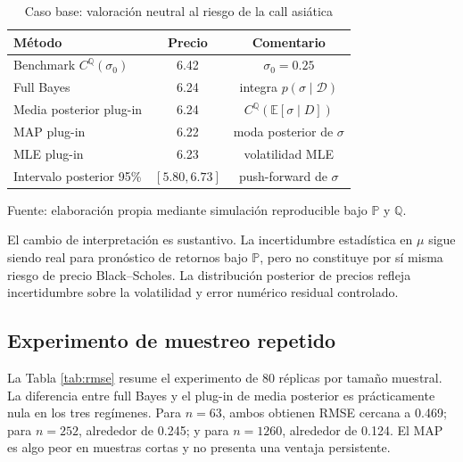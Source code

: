 \documentclass[12pt,letterpaper]{article}
\newcommand{\Pmeasure}{\mathbb{P}}
\newcommand{\Qmeasure}{\mathbb{Q}}
\newcommand{\E}{\mathbb{E}}
\begin{document}
\begin{table}[H]
\centering
\caption{Caso base: valoración neutral al riesgo de la call asiática}
\label{tab:baseline}
\begin{tabular}{lcc}
\toprule
Método & Precio & Comentario \\
\midrule
Benchmark $C^{\Qmeasure}(\sigma_0)$ & 6.42 & $\sigma_0=0.25$ \\
Full Bayes & 6.24 & integra $p(\sigma\mid\mathcal D)$ \\
Media posterior plug-in & 6.24 & $C^{\Qmeasure}(\E[\sigma\mid D])$ \\
MAP plug-in & 6.22 & moda posterior de $\sigma$ \\
MLE plug-in & 6.23 & volatilidad MLE \\
Intervalo posterior 95\% & $[5.80,6.73]$ & push-forward de $\sigma$ \\
\bottomrule
\end{tabular}

\vspace{0.15cm}
\footnotesize Fuente: elaboración propia mediante simulación reproducible bajo $\Pmeasure$ y $\Qmeasure$.
\end{table}

El cambio de interpretación es sustantivo. La incertidumbre estadística en $\mu$ sigue siendo real para pronóstico de retornos bajo $\Pmeasure$, pero no constituye por sí misma riesgo de precio Black--Scholes. La distribución posterior de precios refleja incertidumbre sobre la volatilidad y error numérico residual controlado.

\subsection{Experimento de muestreo repetido}

La Tabla \ref{tab:rmse} resume el experimento de 80 réplicas por tamaño muestral. La diferencia entre full Bayes y el plug-in de media posterior es prácticamente nula en los tres regímenes. Para $n=63$, ambos obtienen RMSE cercana a 0.469; para $n=252$, alrededor de 0.245; y para $n=1260$, alrededor de 0.124. El MAP es algo peor en muestras cortas y no presenta una ventaja persistente.
\end{document}
